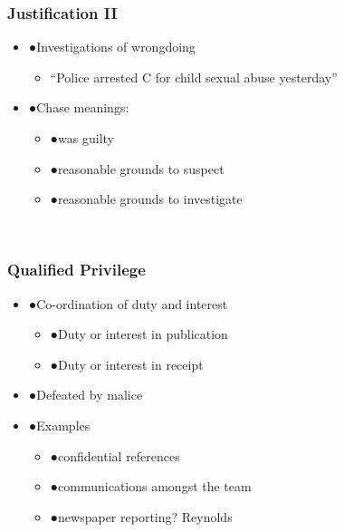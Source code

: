 \documentclass[ignorenonframetext,]{beamer}
\begin{document}
\begin{frame}
\frametitle{Justification II}

\begin{itemize}
\item  {●}Investigations of wrongdoing

  \begin{itemize}
  \item    ``Police arrested C for child sexual abuse yesterday''
  \end{itemize}
\item  {●}{Chase} meanings:

  \begin{itemize}
  \item    {●}was guilty
  \item    {●}reasonable grounds to suspect
  \item    {●}reasonable grounds to investigate
  \end{itemize}
\end{itemize}

~


\end{frame}

\begin{frame}
\frametitle{Qualified Privilege}

\begin{itemize}
\item  {●}Co-ordination of duty and interest

  \begin{itemize}
  \item    {●}Duty or interest in publication
  \item    {●}Duty or interest in receipt
  \end{itemize}
\item  {●}Defeated by {malice}
\item  {●}Examples

  \begin{itemize}
  \item    {●}confidential references
  \item    {●}communications amongst the team
  \item    {●}newspaper reporting? {Reynolds}
  \end{itemize}
\end{itemize}

~


\end{frame}
\end{document}
